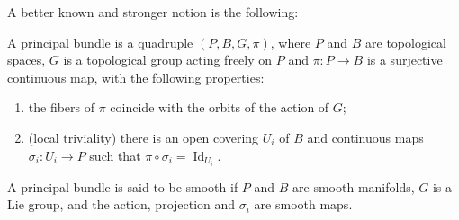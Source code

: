 \documentclass[pdftex]{sigma}
\begin{document}
A better known and stronger notion is the following:
\begin{defi} A principal bundle is a quadruple $(P,B,G,\pi)$, where $P$ and $B$ are topological spaces, $G$ is a topological group acting freely on $P$ and $\pi\colon P\rightarrow B$ is a surjective continuous map, with the following properties:
\begin{enumerate}\itemsep=0pt
\item[1)] the fibers of $\pi$ coincide with the orbits of the action of $G$;
\item[2)] (local triviality) there is an open covering $U_i$ of $B$ and continuous maps $\sigma_i\colon U_i\rightarrow P$ such that $\pi\circ\sigma_i=\operatorname{Id}_{U_i}$.
\end{enumerate}
A principal bundle is said to be smooth if $P$ and $B$ are smooth manifolds, $G$ is a Lie group, and the action, projection and $\sigma_i$ are smooth maps.
\end{defi}
\end{document}
